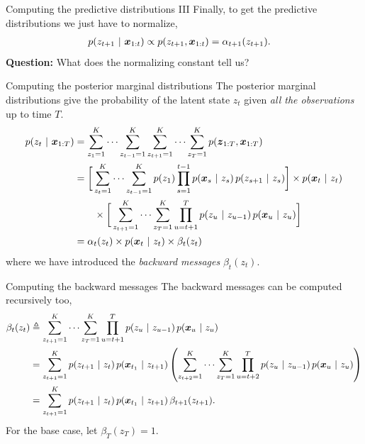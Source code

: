 \documentclass[aspectratio=169]{beamer}
\begin{document}
\begin{frame}[t]{Computing the predictive distributions III}
    Finally, to get the predictive distributions we just have to normalize,
    \begin{align}
        p(z_{t+1} ~\vert~ \boldsymbol{x}_{1:t}) &\propto p(z_{t+1}, \boldsymbol{x}_{1:t}) = \alpha_{t+1}(z_{t+1}).
    \end{align}
    \textbf{Question:} What does the normalizing constant tell us?
\end{frame}

\begin{frame}{Computing the posterior marginal distributions}
    The posterior marginal distributions give the probability of the latent state $z_{t}$ given \textit{all the observations} up to time $T$.
    \begin{align}
        p(z_{t} ~\vert~ \boldsymbol{x}_{1:T}) 
        &= \sum_{z_1=1}^K \cdots \sum_{z_{t-1}=1}^K \sum_{z_{t+1}=1}^K \cdots \sum_{z_T=1}^K p(\boldsymbol{z}_{1:T}, \boldsymbol{x}_{1:T}) \\
        &= \nonumber 
        \bigg[ \sum_{z_{t}=1}^K \cdots \sum_{z_{t-1}=1}^K p(z_1) \prod_{s=1}^{t-1} p(\boldsymbol{x}_s ~\vert~ z_s) \, p(z_{s+1} ~\vert~ z_{s}) \bigg]
        \times  p(\boldsymbol{x}_t ~\vert~ z_t)   \\
        &\qquad \times \bigg[ \sum_{z_{t+1}=1}^K \cdots \sum_{z_T=1}^K \prod_{u=t+1}^T p(z_{u} ~\vert~ z_{u-1}) \, p(\boldsymbol{x}_u ~\vert~ z_u) \bigg] \\
        &= \alpha_t(z_t) \times p(\boldsymbol{x}_t ~\vert~ z_t) \times \beta_t(z_t)
    \end{align}
    where we have introduced the \textit{backward messages} $\beta_t(z_t)$.
\end{frame}

\begin{frame}{Computing the backward messages}
    The backward messages can be computed recursively too,
    \begin{align}
        \beta_t(z_t) 
        &\triangleq \sum_{z_{t+1}=1}^K \cdots \sum_{z_T=1}^K \prod_{u=t+1}^T p(z_{u} ~\vert~ z_{u-1}) \, p(\boldsymbol{x}_u ~\vert~ z_u) \\
        &= \sum_{z_{t+1}=1}^K p(z_{t+1} ~\vert~ z_t) \, p(\boldsymbol{x}_{t_1} ~\vert~ z_{t+1}) \left(\sum_{z_{t+2}=1}^K \cdots \sum_{z_T=1}^K \prod_{u=t+2}^T p(z_{u} ~\vert~ z_{u-1}) \, p(\boldsymbol{x}_u ~\vert~ z_u) \right) \\
        &= \sum_{z_{t+1}=1}^K p(z_{t+1} ~\vert~ z_t) \, p(\boldsymbol{x}_{t_1} ~\vert~ z_{t+1}) \, \beta_{t+1}(z_{t+1}).
    \end{align}
    For the base case, let $\beta_T(z_T) = 1$.
\end{frame}
\end{document}
